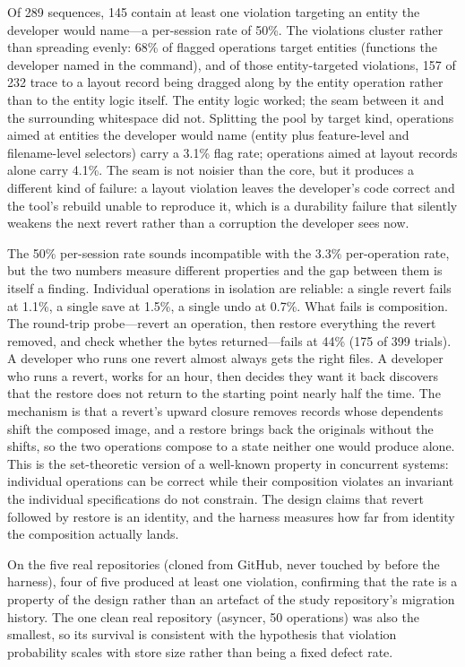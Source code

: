 Of 289 sequences, 145 contain at least one violation targeting an entity the
developer would name---a per-session rate of 50\%. The violations cluster
rather than spreading evenly: 68\% of flagged operations target entities
(functions the developer named in the command), and of those entity-targeted
violations, 157 of 232 trace to a layout record being dragged along by the
entity operation rather than to the entity logic itself. The entity logic
worked; the seam between it and the surrounding whitespace did not. Splitting
the pool by target kind, operations aimed at entities the developer would name
(entity plus feature-level and filename-level selectors) carry a 3.1\% flag
rate; operations aimed at layout records alone carry 4.1\%. The seam is not
noisier than the core, but it produces a different kind of failure: a layout
violation leaves the developer's code correct and the tool's rebuild unable to
reproduce it, which is a durability failure that silently weakens the next
revert rather than a corruption the developer sees now.

The 50\% per-session rate sounds incompatible with the 3.3\% per-operation rate,
but the two numbers measure different properties and the gap between them is itself
a finding. Individual operations in isolation are reliable: a single revert fails at
1.1\%, a single save at 1.5\%, a single undo at 0.7\%. What fails is composition.
The round-trip probe---revert an operation, then restore everything the revert
removed, and check whether the bytes returned---fails at 44\% (175 of 399 trials).
A developer who runs one revert almost always gets the right files. A developer who
runs a revert, works for an hour, then decides they want it back discovers that the
restore does not return to the starting point nearly half the time. The mechanism is
that a revert's upward closure removes records whose dependents shift the composed
image, and a restore brings back the originals without the shifts, so the two
operations compose to a state neither one would produce alone. This is the
set-theoretic version of a well-known property in concurrent systems: individual
operations can be correct while their composition violates an invariant the
individual specifications do not constrain. The design claims that revert followed
by restore is an identity, and the harness measures how far from identity the
composition actually lands.

On the five real repositories (cloned from GitHub, never touched by \sgt{} before
the harness), four of five produced at least one violation, confirming that the
rate is a property of the design rather than an artefact of the study repository's
migration history. The one clean real repository (asyncer, 50 operations) was also
the smallest, so its survival is consistent with the hypothesis that violation
probability scales with store size rather than being a fixed defect rate.

